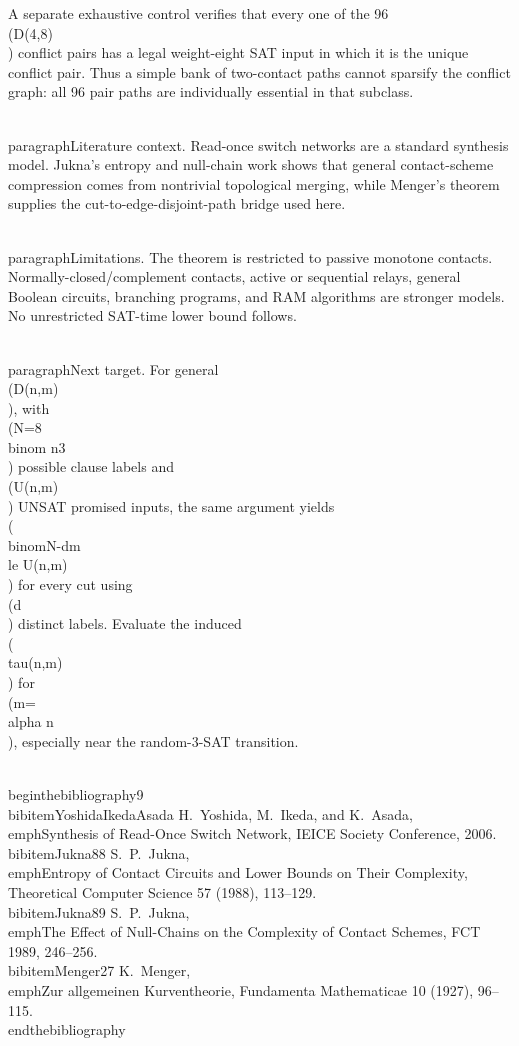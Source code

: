 A separate exhaustive control verifies that every one of the 96 \\(D(4,8)\\) conflict pairs
has a legal weight-eight SAT input in which it is the unique conflict pair. Thus a simple bank
of two-contact paths cannot sparsify the conflict graph: all 96 pair paths are individually
essential in that subclass.

\\paragraph{Literature context.}
Read-once switch networks are a standard synthesis model. Jukna's entropy and null-chain work
shows that general contact-scheme compression comes from nontrivial topological merging, while
Menger's theorem supplies the cut-to-edge-disjoint-path bridge used here.

\\paragraph{Limitations.}
The theorem is restricted to passive monotone contacts. Normally-closed/complement contacts,
active or sequential relays, general Boolean circuits, branching programs, and RAM algorithms
are stronger models. No unrestricted SAT-time lower bound follows.

\\paragraph{Next target.}
For general \\(D(n,m)\\), with \\(N=8\\binom n3\\) possible clause labels and \\(U(n,m)\\)
UNSAT promised inputs, the same argument yields \\(\\binom{N-d}{m}\\le U(n,m)\\) for every
cut using \\(d\\) distinct labels. Evaluate the induced \\(\\tau(n,m)\\) for \\(m=\\alpha n\\),
especially near the random-3-SAT transition.

\\begin{thebibliography}{9}
\\bibitem{YoshidaIkedaAsada} H.~Yoshida, M.~Ikeda, and K.~Asada,
\\emph{Synthesis of Read-Once Switch Network}, IEICE Society Conference, 2006.
\\bibitem{Jukna88} S.~P.~Jukna, \\emph{Entropy of Contact Circuits and Lower Bounds on Their Complexity},
Theoretical Computer Science 57 (1988), 113--129.
\\bibitem{Jukna89} S.~P.~Jukna, \\emph{The Effect of Null-Chains on the Complexity of Contact Schemes},
FCT 1989, 246--256.
\\bibitem{Menger27} K.~Menger, \\emph{Zur allgemeinen Kurventheorie}, Fundamenta Mathematicae 10 (1927), 96--115.
\\end{thebibliography}

